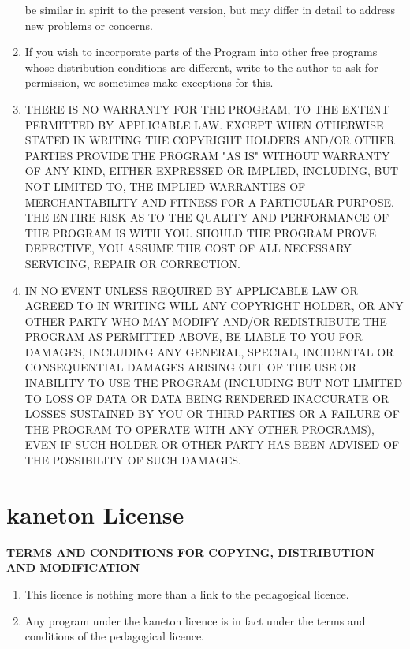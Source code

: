 \begin{enumerate}
    be similar in spirit to the present version, but may differ in
    detail to address new problems or concerns.
  \item
    If you wish to incorporate parts of the Program into other free
    programs whose distribution conditions are different, write to the
    author to ask for permission, we sometimes make exceptions for this.
  \item
    THERE IS NO WARRANTY FOR THE PROGRAM, TO THE EXTENT PERMITTED BY
    APPLICABLE LAW. EXCEPT WHEN OTHERWISE STATED IN WRITING THE
    COPYRIGHT HOLDERS AND/OR OTHER PARTIES PROVIDE THE PROGRAM "AS IS"
    WITHOUT WARRANTY OF ANY KIND, EITHER EXPRESSED OR IMPLIED,
    INCLUDING, BUT NOT LIMITED TO, THE IMPLIED WARRANTIES OF
    MERCHANTABILITY AND FITNESS FOR A PARTICULAR PURPOSE. THE ENTIRE
    RISK AS TO THE QUALITY AND PERFORMANCE OF THE PROGRAM IS WITH
    YOU. SHOULD THE PROGRAM PROVE DEFECTIVE, YOU ASSUME THE COST OF
    ALL NECESSARY SERVICING, REPAIR OR CORRECTION.
  \item
    IN NO EVENT UNLESS REQUIRED BY APPLICABLE LAW OR AGREED TO IN
    WRITING WILL ANY COPYRIGHT HOLDER, OR ANY OTHER PARTY WHO MAY
    MODIFY AND/OR REDISTRIBUTE THE PROGRAM AS PERMITTED ABOVE, BE
    LIABLE TO YOU FOR DAMAGES, INCLUDING ANY GENERAL, SPECIAL,
    INCIDENTAL OR CONSEQUENTIAL DAMAGES ARISING OUT OF THE USE OR
    INABILITY TO USE THE PROGRAM (INCLUDING BUT NOT LIMITED TO LOSS OF
    DATA OR DATA BEING RENDERED INACCURATE OR LOSSES SUSTAINED BY YOU
    OR THIRD PARTIES OR A FAILURE OF THE PROGRAM TO OPERATE WITH ANY
    OTHER PROGRAMS), EVEN IF SUCH HOLDER OR OTHER PARTY HAS BEEN
    ADVISED OF THE POSSIBILITY OF SUCH DAMAGES.
\end{enumerate}

%
%

\section{kaneton License}
\label{section:kaneton license}

\textbf{TERMS AND CONDITIONS FOR COPYING, DISTRIBUTION AND MODIFICATION}

\begin{enumerate}
  \item
    This licence is nothing more than a link to the pedagogical licence.
  \item
    Any program under the kaneton licence is in fact under the terms and
    conditions of the pedagogical licence.
\end{enumerate}
